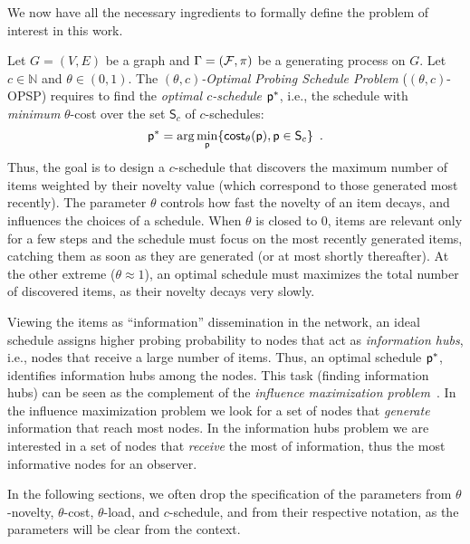 We now have all the necessary ingredients to formally define the problem of
interest in this work.

 Let $G=(V,E)$ be a graph and $\Gamma=(\mathcal{F},\pi)$ be a
generating process on $G$. Let $c\in\mathbb{N}$ and
$\theta\in(0,1)$. The \emph{$(\theta,c)$-Optimal Probing Schedule Problem}
($(\theta,c)$-OPSP) requires to find the \emph{optimal $c$-schedule} $\mathsf{p}^*$,
i.e., the schedule with \emph{minimum} $\theta$-cost over the set $\mathsf{S}_c$
of $c$-schedules:
\[
	\mathsf{p}^*=\arg\min_{\mathsf{p}} \{\mathsf{cost}_\theta(\mathsf{p}), \mathsf{p}\in\mathsf{S}_c\}\enspace.
\]
Thus, the goal is to design a $c$-schedule that discovers the maximum number of items weighted by their
novelty value (which correspond to those generated most recently).
The parameter $\theta$ controls how fast the novelty of an item decays, and influences the choices of a schedule.
When $\theta$ is closed to $0$, items are relevant only for a few steps and the schedule
must focus on the most recently generated items, catching them as soon as they are generated (or at most shortly
thereafter). At the other extreme ($\theta\approx 1$), an optimal schedule 
must maximizes the total number of discovered items, as their novelty decays very
slowly. 

Viewing the items as ``information'' dissemination in the network,
an ideal schedule assigns higher probing probability  to nodes
that act as \emph{ information hubs}, i.e., nodes that receive a large number of
items. Thus, an optimal schedule $\mathsf{p}^*$, identifies
information hubs among the nodes. This task (finding information hubs) can be
seen as the complement of the \emph{influence maximization
problem}~\citep{Kempe2003,Kempe2005}. In the influence maximization problem we
look for a set of nodes that \emph{generate} information that reach most nodes.
In the information hubs problem we are interested in a set of nodes that
\emph{receive} the most of information, thus the most informative nodes for an
observer.

In the following sections, we often drop the specification of the parameters
from $\theta$-novelty, $\theta$-cost, $\theta$-load, and $c$-schedule, and
from their respective notation, as the parameters will be clear from the
context.

